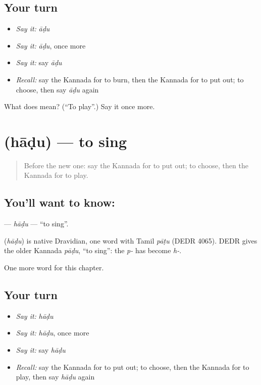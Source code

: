 \subsection*{Your turn}
\begin{itemize}
\raggedright
  \item \emph{Say it:} \emph{āḍu}
  \item \emph{Say it:} \emph{āḍu}, once more
  \item \emph{Say it:} say \emph{āḍu}
  \item \emph{Recall:} say the Kannada for to burn, then the Kannada for to put out; to choose, then say \emph{āḍu} again
\end{itemize}

\begin{tcolorbox}[breakable,colback=teal!4,colframe=teal!35!black,title={Before you move on}]
What does  mean? (\textquotedblleft{}To play\textquotedblright{}.) Say it once more.
\end{tcolorbox}
\section[\texorpdfstring{\kn{ಹಾಡು} (hāḍu)}{ಹಾಡು (hāḍu)}]{ (hāḍu) — to sing}

\label{lesson:KA-C152-hadu}



\begin{quote}
Before the new one: say the Kannada for to put out; to choose, then the Kannada for to play.
\end{quote}

\subsection*{You'll want to know: }
\textbf{} — \emph{hāḍu} — \textquotedblleft{}to sing\textquotedblright{}.

\begin{cousinweb}
\textbf{} (\emph{hāḍu}) is native Dravidian, one word with Tamil \emph{pāṭu} (DEDR 4065). DEDR gives the older Kannada \emph{pāḍu}, \textquotedblleft{}to sing\textquotedblright{}: the \emph{p-} has become \emph{h-}.
\end{cousinweb}

\begin{grammarlens}[title={What you've built}]
One more word for this chapter.
\end{grammarlens}

\subsection*{Your turn}
\begin{itemize}
\raggedright
  \item \emph{Say it:} \emph{hāḍu}
  \item \emph{Say it:} \emph{hāḍu}, once more
  \item \emph{Say it:} say \emph{hāḍu}
  \item \emph{Recall:} say the Kannada for to put out; to choose, then the Kannada for to play, then say \emph{hāḍu} again
\end{itemize}

